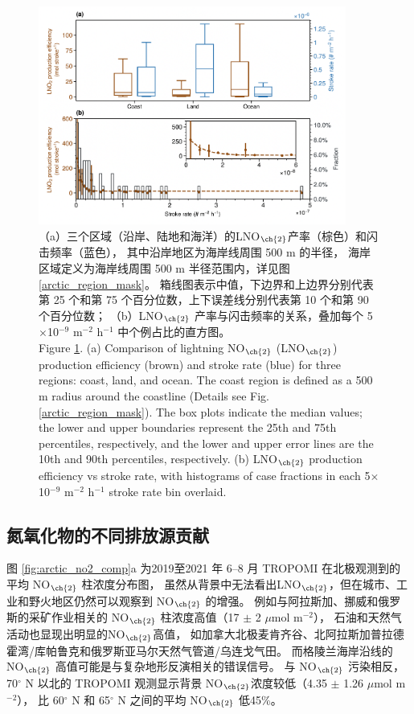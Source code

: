 \begin{figure}[H]
\centering
\includegraphics[width=0.9\textwidth]{./figures/arctic_pe_rate.png}
\caption{
（a）三个区域（沿岸、陆地和海洋）的LNO$_{\ch{2}}$产率（棕色）和闪击频率（蓝色），
其中沿岸地区为海岸线周围 500 m 的半径，
海岸区域定义为海岸线周围 500 m 半径范围内，详见图\ref{arctic_region_mask}。
箱线图表示中值，下边界和上边界分别代表第 25 个和第 75 个百分位数，上下误差线分别代表第 10 个和第 90 个百分位数；
（b）LNO$_{\ch{2}}$ 产率与闪击频率的关系，叠加每个 5$\times$10$^{-9}$ m$^{-2}$ h$^{-1}$ 中个例占比的直方图。 \\
Figure \ref{fig:arctic_pe_rate}. (a) Comparison of lightning NO$_{\ch{2}}$ (LNO$_{\ch{2}}$) production efficiency (brown) and stroke rate (blue) for three regions: coast, land, and ocean.
The coast region is defined as a 500 m radius around the coastline (Details see Fig. \ref{arctic_region_mask}).
The box plots indicate the median values; the lower and upper boundaries represent the 25th and 75th percentiles, respectively, and the lower and upper error lines are the 10th and 90th percentiles, respectively.
(b) LNO$_{\ch{2}}$ production efficiency vs stroke rate, with histograms of case fractions in each 5$\times$10$^{-9}$ m$^{-2}$ h$^{-1}$ stroke rate bin overlaid.
}
\label{fig:arctic_pe_rate}
\end{figure}

\subsection{氮氧化物的不同排放源贡献}


图 \ref{fig:arctic_no2_comp}a 为2019至2021 年 6--8 月 TROPOMI 在北极观测到的平均 NO$_{\ch{2}}$ 柱浓度分布图，
虽然从背景中无法看出LNO$_{\ch{2}}$，但在城市、工业和野火地区仍然可以观察到 NO$_{\ch{2}}$ 的增强。
例如与阿拉斯加、挪威和俄罗斯的采矿作业相关的 NO$_{\ch{2}}$ 柱浓度高值（17 $\pm$ 2 $\mu$mol m$^{-2}$），
石油和天然气活动也显现出明显的NO$_{\ch{2}}$高值，
如加拿大北极麦肯齐谷、北阿拉斯加普拉德霍湾/库帕鲁克和俄罗斯亚马尔天然气管道/乌连戈气田\citep{VanDerA.2020}。
而格陵兰海岸沿线的 NO$_{\ch{2}}$ 高值可能是与复杂地形反演相关的错误信号\citep{Hachmeister.2022}。
与 NO$_{\ch{2}}$ 污染相反，70$^{\circ}$ N 以北的 TROPOMI 观测显示背景 NO$_{\ch{2}}$浓度较低（4.35 $\pm$ 1.26 $\mu$mol m$^{-2}$），
比 60$^{\circ}$ N 和 65$^{\circ}$ N 之间的平均 NO$_{\ch{2}}$ 低45\%。

